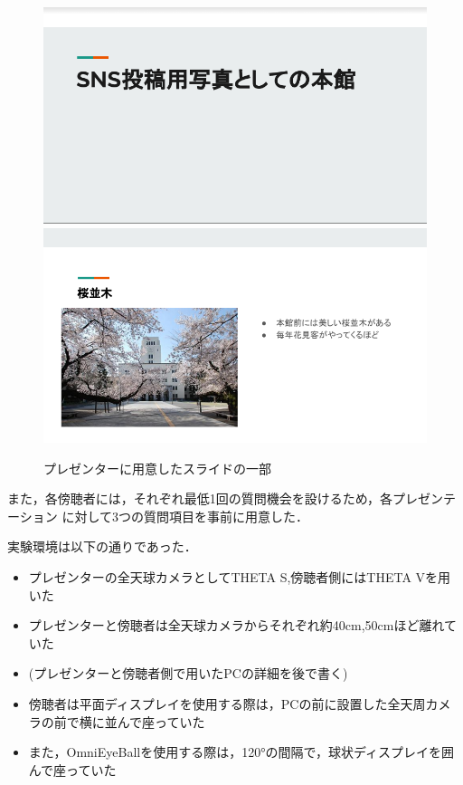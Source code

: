 \begin{figure}[tp]
  \centering
  \includegraphics[scale=0.7]{fig/slide1.png}
  \includegraphics[scale=0.7]{fig/slide2.png}
  \caption{プレゼンターに用意したスライドの一部}
\end{figure}

また，各傍聴者には，それぞれ最低1回の質問機会を設けるため，各プレゼンテーション
に対して3つの質問項目を事前に用意した．

実験環境は以下の通りであった．

\begin{itemize}
  \item プレゼンターの全天球カメラとしてTHETA S,傍聴者側にはTHETA Vを用いた
  \item プレゼンターと傍聴者は全天球カメラからそれぞれ約40cm,50cmほど離れていた
  \item (プレゼンターと傍聴者側で用いたPCの詳細を後で書く)
  \item 傍聴者は平面ディスプレイを使用する際は，PCの前に設置した全天周カメラの前で横に並んで座っていた
  \item また，OmniEyeBallを使用する際は，120°の間隔で，球状ディスプレイを囲んで座っていた
\end{itemize}


